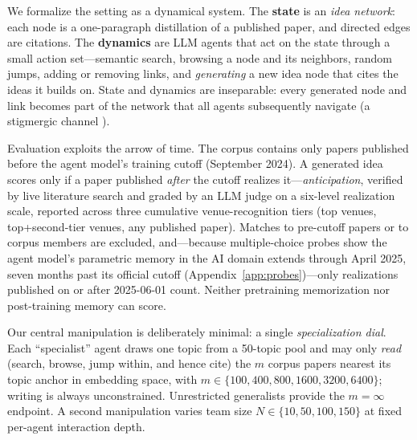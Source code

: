 \documentclass{article} %
\begin{document}
We formalize the setting as a dynamical system. The \textbf{state} is an
\emph{idea network}: each node is a one-paragraph distillation of a
published paper, and directed edges are citations. The \textbf{dynamics}
are LLM agents that act on the state through a small action set---semantic
search, browsing a node and its neighbors, random jumps, adding or removing
links, and \emph{generating} a new idea node that cites the ideas it builds
on. State and dynamics are inseparable: every generated node and link
becomes part of the network that all agents subsequently navigate
(a stigmergic channel \citep{theraulaz1999stigmergy}).

Evaluation exploits the arrow of time. The corpus contains only papers
published before the agent model's training cutoff (September 2024). A
generated idea scores only if a paper published \emph{after} the cutoff
realizes it---\emph{anticipation}, verified by live literature search
\citep{kinney2023s2,priem2022openalex} and graded by an LLM judge on a
six-level realization scale, reported across three cumulative
venue-recognition tiers (top venues, top+second-tier venues, any published
paper). Matches to pre-cutoff papers or to corpus members are excluded,
and---because multiple-choice probes show the agent model's parametric
memory in the AI domain extends through April 2025, seven months past its
official cutoff (Appendix~\ref{app:probes})---only realizations published
on or after 2025-06-01 count. Neither pretraining memorization nor
post-training memory can score.

Our central manipulation is deliberately minimal: a single
\emph{specialization dial}. Each ``specialist'' agent draws one topic from
a 50-topic pool and may only \emph{read} (search, browse, jump within, and
hence cite) the $m$ corpus papers nearest its topic anchor in embedding
space, with $m \in \{100, 400, 800, 1600, 3200, 6400\}$; writing is
always unconstrained. Unrestricted generalists provide the $m=\infty$ endpoint. A
second manipulation varies team size $N \in \{10, 50, 100, 150\}$ at fixed
per-agent interaction depth.
\end{document}
